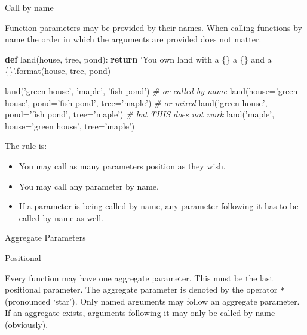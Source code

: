 \documentclass[ignorenonframetext,]{beamer}
\newenvironment{Shaded}{}{}
\newcommand{\KeywordTok}[1]{\textcolor[rgb]{0.00,0.44,0.13}{\textbf{{#1}}}}
\newcommand{\StringTok}[1]{\textcolor[rgb]{0.25,0.44,0.63}{{#1}}}
\newcommand{\CommentTok}[1]{\textcolor[rgb]{0.38,0.63,0.69}{\textit{{#1}}}}
\newcommand{\ControlFlowTok}[1]{\textcolor[rgb]{0.00,0.44,0.13}{\textbf{{#1}}}}
\newcommand{\OperatorTok}[1]{\textcolor[rgb]{0.40,0.40,0.40}{{#1}}}
\newcommand{\BuiltInTok}[1]{{#1}}
\newcommand{\NormalTok}[1]{{#1}}
\providecommand{\tightlist}{%
  \setlength{\itemsep}{0pt}\setlength{\parskip}{0pt}}
\begin{document}
\begin{frame}[fragile]{Call by name}

Function parameters may be provided by their names. When calling
functions by name the order in which the arguments are provided does not
matter.

\begin{Shaded}
\begin{Highlighting}[]
\KeywordTok{def} \NormalTok{land(house, tree, pond):}
    \ControlFlowTok{return} \StringTok{'You own land with a \{\} a \{\} and a \{\}'}\NormalTok{.}\BuiltInTok{format}\NormalTok{(house, tree, pond)}

\NormalTok{land(}\StringTok{'green house'}\NormalTok{, }\StringTok{'maple'}\NormalTok{, }\StringTok{'fish pond'}\NormalTok{)}
\CommentTok{# or called by name}
\NormalTok{land(house}\OperatorTok{=}\StringTok{'green house'}\NormalTok{, pond}\OperatorTok{=}\StringTok{'fish pond'}\NormalTok{, tree}\OperatorTok{=}\StringTok{'maple'}\NormalTok{)}
\CommentTok{# or mixed}
\NormalTok{land(}\StringTok{'green house'}\NormalTok{, pond}\OperatorTok{=}\StringTok{'fish pond'}\NormalTok{, tree}\OperatorTok{=}\StringTok{'maple'}\NormalTok{)}
\CommentTok{# but THIS does not work}
\NormalTok{land(}\StringTok{'maple'}\NormalTok{, house}\OperatorTok{=}\StringTok{'green house'}\NormalTok{, tree}\OperatorTok{=}\StringTok{'maple'}\NormalTok{)}
\end{Highlighting}
\end{Shaded}

\end{frame}

\begin{frame}

The rule is:

\begin{itemize}
\tightlist
\item
  You may call as many parameters position as they wish.
\item
  You may call any parameter by name.
\item
  If a parameter is being called by name, any parameter following it has
  to be called by name as well.
\end{itemize}

\end{frame}

\begin{frame}{Aggregate Parameters}

\end{frame}

\begin{frame}

\begin{block}{Positional}

Every function may have one aggregate parameter. This must be the last
positional parameter. The aggregate parameter is denoted by the operator
\texttt{*} (pronounced `star'). Only named arguments may follow an
aggregate parameter. If an aggregate exists, arguments following it may
only be called by name (obviously).

\end{block}

\end{frame}
\end{document}
